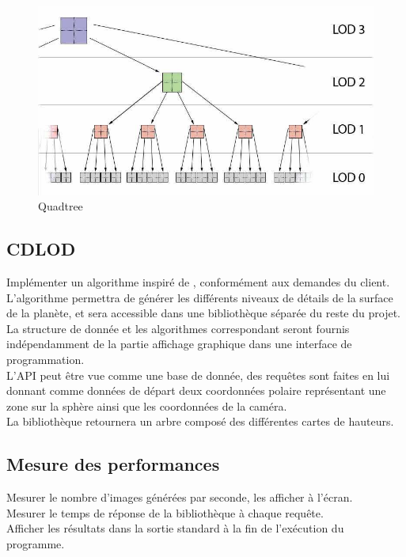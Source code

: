 \documentclass[12pt]{report}
\begin{document}
\begin{figure}[!h]
  \includegraphics[scale=0.5]{img/Quadtree.png}
  \caption{Quadtree \cite{CDLOD}}
  \label{fig:quadtree}
\end{figure}

\subsection{CDLOD}

Implémenter un algorithme inspiré de \cite{CDLOD}, conformément aux
demandes du client.\\
L'algorithme permettra de générer les différents niveaux de détails de
la surface de la planète, et sera accessible dans une bibliothèque
séparée du reste du projet.\\
La structure de donnée et les algorithmes correspondant seront fournis
indépendamment de la partie affichage graphique dans une interface de
programmation.\\
L'API peut être vue comme une base de donnée, des requêtes sont faites
en lui donnant comme données de départ deux coordonnées polaire
représentant une zone sur la sphère ainsi que les coordonnées de la
caméra.\\
La bibliothèque retournera un arbre composé des différentes cartes de
hauteurs.\\

\subsection{Mesure des performances}

Mesurer le nombre d'images générées par seconde, les afficher à l'écran.\\
Mesurer le temps de réponse de la bibliothèque à chaque requête.\\
Afficher les résultats dans la sortie standard à la fin de l'exécution
du programme.\\
\end{document}
